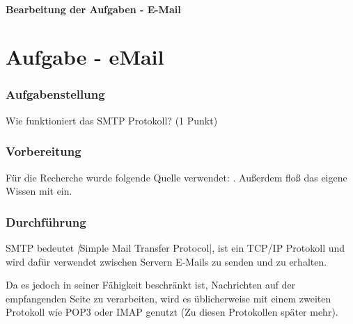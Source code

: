 \newpage
{}
\paragraph{\LARGE Bearbeitung der Aufgaben - E-Mail}

\section{\Large Aufgabe - eMail}
	\subsubsection{\textbf{Aufgabenstellung}}
	Wie funktioniert das SMTP Protokoll? (1 Punkt)
	\subsubsection{\textbf{Vorbereitung}}
	Für die Recherche wurde folgende Quelle verwendet: \cite{email}. Außerdem floß das eigene Wissen mit ein.\newline
	\subsubsection{\textbf{Durchführung}}
	SMTP bedeutet \textit|Simple Mail Transfer Protocol|, ist ein TCP/IP Protokoll und wird dafür verwendet zwischen Servern E-Mails zu senden und zu erhalten.\newline\newline

Da es jedoch in seiner Fähigkeit beschränkt ist, Nachrichten auf der empfangenden Seite zu verarbeiten, wird es üblicherweise mit einem zweiten Protokoll wie POP3 oder IMAP genutzt (Zu diesen Protokollen später mehr).\newline\newline

